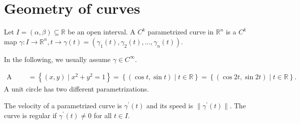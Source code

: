 \chapter{Geometry of curves}
\begin{definition}
    Let \(I = (\alpha , \beta ) \subseteq \mathbb{R} \) be an open interval. A \(C^k\) parametrized curve in \(\mathbb{R} ^n\) is a \(C^k\) map \(\gamma : I \to \mathbb{R} ^n, t \to \gamma (t) = (\gamma _1(t), \gamma _2(t), \dots , \gamma _n(t))\).     
\end{definition}

In the following, we usually assume \(\gamma \in C^{\infty} \). 

\begin{eg}
    \begin{align*}
        \text{A unit circle} &= \left\{ (x, y) \mid x^2 + y^2 = 1 \right\} = \left\{ (\cos t, \sin t) \mid t \in \mathbb{R} \right\} = \left\{ (\cos 2t, \sin 2t) \mid t \in \mathbb{R} \right\}.    
    \end{align*}
    A unit circle has two different parametrizations.
\end{eg}

\begin{definition}
    The velocity of a parametrized curve is \(\gamma ^{\prime} (t)\) and its speed is \(\lVert \gamma ^{\prime} (t) \rVert \). The curve is regular if \(\gamma ^{\prime} (t) \neq 0\) for all \(t \in I\).   
\end{definition}

